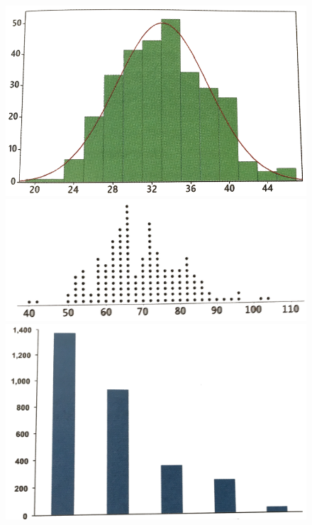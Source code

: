 \documentclass[
  letterpaper,
  DIV=11,
  numbers=noendperiod,
  oneside]{scrartcl}
\begin{document}
\begin{figure}

\begin{minipage}{0.25\linewidth}

\includegraphics{www/thumbnail-hist2.png}

\end{minipage}%
%
\begin{minipage}{0.25\linewidth}

\includegraphics{www/thumbnail-dotplot.png}

\end{minipage}%
%
\begin{minipage}{0.25\linewidth}

\includegraphics{www/thumbnail-barchart.png}


\end{minipage}
\end{figure}
\end{document}
